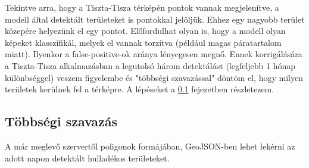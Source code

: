 Tekintve arra, hogy a Tiszta-Tisza térképén pontok vannak megjelenítve, a modell által detektált területeket is pontokkal jelöljük. Ehhez egy nagyobb terület közepére helyezünk el egy pontot. Előfordulhat olyan is, hogy a modell olyan képeket klasszifikál, melyek el vannak torzítva (például magas páratartalom miatt). Ilyenkor a false-positive-ok aránya lényegesen megnő. Ennek korrigálására a Tiszta-Tisza alkalmazásban a legutolsó három detektálást (legfeljebb 1 hónap különbséggel) veszem figyelembe és "többségi szavazással" döntöm el, hogy milyen területek kerülnek fel a térképre. A lépéseket a \ref{ch:voting} fejezetben részletezem.

\subsection{Többségi szavazás}
\label{ch:voting}

A már meglevő szervertől poligonok formájában, GeoJSON-ben \cite{rfc7946} lehet lekérni az adott napon detektált hulladékos területeket. 